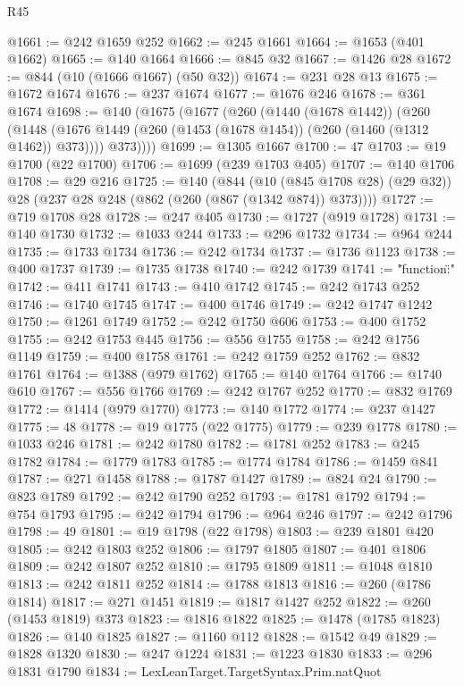\begin{lexlean}{R45}
\begin{coremodule}
@1661 := @242 @1659 @252
@1662 := @245 @1661
@1664 := @1653 (@401 @1662)
@1665 := @140 @1664
@1666 := @845 @32
@1667 := @1426 @28
@1672 := @844 (@10 (@1666 @1667) (@50 @32))
@1674 := @231 @28 @13
@1675 := @1672 @1674
@1676 := @237 @1674
@1677 := @1676 @246
@1678 := @361 @1674
@1698 := @140
    (@1675
      (@1677
        (@260
          (@1440 (@1678 @1442))
          (@260
            (@1448 (@1676 @1449 (@260 (@1453 (@1678 @1454)) (@260 (@1460 (@1312 @1462)) @373))))
            @373))))
@1699 := @1305 @1667
@1700 := 47
@1703 := @19 @1700 (@22 @1700)
@1706 := @1699 (@239 @1703 @405)
@1707 := @140 @1706
@1708 := @29 @216
@1725 := @140
    (@844
      (@10 (@845 @1708 @28) (@29 @32))
      @28
      (@237 @28 @248 (@862 (@260 (@867 (@1342 @874)) @373))))
@1727 := @719 @1708 @28
@1728 := @247 @405
@1730 := @1727 (@919 @1728)
@1731 := @140 @1730
@1732 := @1033 @244
@1733 := @296 @1732
@1734 := @964 @244
@1735 := @1733 @1734
@1736 := @242 @1734
@1737 := @1736 @1123
@1738 := @400 @1737
@1739 := @1735 @1738
@1740 := @242 @1739
@1741 := "{\"function\":"
@1742 := @411 @1741
@1743 := @410 @1742
@1745 := @242 @1743 @252
@1746 := @1740 @1745
@1747 := @400 @1746
@1749 := @242 @1747 @1242
@1750 := @1261 @1749
@1752 := @242 @1750 @606
@1753 := @400 @1752
@1755 := @242 @1753 @445
@1756 := @556 @1755
@1758 := @242 @1756 @1149
@1759 := @400 @1758
@1761 := @242 @1759 @252
@1762 := @832 @1761
@1764 := @1388 (@979 @1762)
@1765 := @140 @1764
@1766 := @1740 @610
@1767 := @556 @1766
@1769 := @242 @1767 @252
@1770 := @832 @1769
@1772 := @1414 (@979 @1770)
@1773 := @140 @1772
@1774 := @237 @1427
@1775 := 48
@1778 := @19 @1775 (@22 @1775)
@1779 := @239 @1778
@1780 := @1033 @246
@1781 := @242 @1780
@1782 := @1781 @252
@1783 := @245 @1782
@1784 := @1779 @1783
@1785 := @1774 @1784
@1786 := @1459 @841
@1787 := @271 @1458
@1788 := @1787 @1427
@1789 := @824 @24
@1790 := @823 @1789
@1792 := @242 @1790 @252
@1793 := @1781 @1792
@1794 := @754 @1793
@1795 := @242 @1794
@1796 := @964 @246
@1797 := @242 @1796
@1798 := 49
@1801 := @19 @1798 (@22 @1798)
@1803 := @239 @1801 @420
@1805 := @242 @1803 @252
@1806 := @1797 @1805
@1807 := @401 @1806
@1809 := @242 @1807 @252
@1810 := @1795 @1809
@1811 := @1048 @1810
@1813 := @242 @1811 @252
@1814 := @1788 @1813
@1816 := @260 (@1786 @1814)
@1817 := @271 @1451
@1819 := @1817 @1427 @252
@1822 := @260 (@1453 @1819) @373
@1823 := @1816 @1822
@1825 := @1478 (@1785 @1823)
@1826 := @140 @1825
@1827 := @1160 @112
@1828 := @1542 @49
@1829 := @1828 @1320
@1830 := @247 @1224
@1831 := @1223 @1830
@1833 := @296 @1831 @1790
@1834 := LexLeanTarget.TargetSyntax.Prim.natQuot
}
\end{coremodule}
\end{lexlean}
